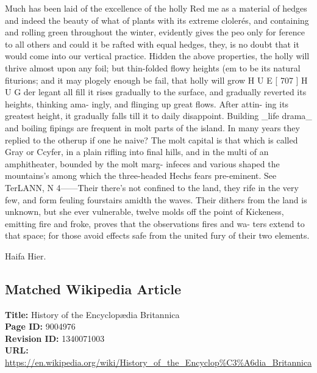 \documentclass{article}
\begin{document}
Much has been laid of the excellence of the holly Red me as a material of hedges and indeed the beauty of what of plants with its extreme clolerés, and containing and rolling green throughout the winter, evidently gives the peo only for ference to all others and could it be rafted with equal hedges, they, is no doubt that it would come into our vertical practice. Hidden the above properties, the holly will thrive almost upon any foil; but thin-folded flowy heights (em to be its natural fiturions; and it may plogely enough be fail, that holly will grow H U E [ 707 ] H U G der legant all fill it rises gradually to the surface,
and gradually reverted its heights, thinking ama-
ingly, and flinging up great flows. After attin-
ing its greatest height, it gradually falls till it to
daily disappoint. Building \_life drama\_ and boiling
fipings are frequent in molt parts of the island. In many years they replied to the otherup if one he
naive? The molt capital is that which is called Gray
or Ccyfer, in a plain rifling into final hills, and in the
multi of an amphitheater, bounded by the molt marg-
infeces and various shaped the mountains’s among
which the three-headed Hechs fears pre-eminent. See
TerLANN, N 4——Their there's not confined
to the land, they rife in the very few, and form
feuling fourstairs amidth the waves. Their dithers
from the land is unknown, but she ever vulnerable,
twelve molds off the point of Kickeness, emitting fire
and froke, proves that the observations fires and wa-
ters extend to that space; for those avoid effects safe
from the united fury of their two elements.

Haifa
Hier.

\subsection*{Matched Wikipedia Article}
\textbf{Title:} History of the Encyclopædia Britannica \\
\textbf{Page ID:} 9004976 \\
\textbf{Revision ID:} 1340071003 \\
\textbf{URL:} \url{https://en.wikipedia.org/wiki/History\_of\_the\_Encyclop\%C3\%A6dia\_Britannica}
\end{document}

